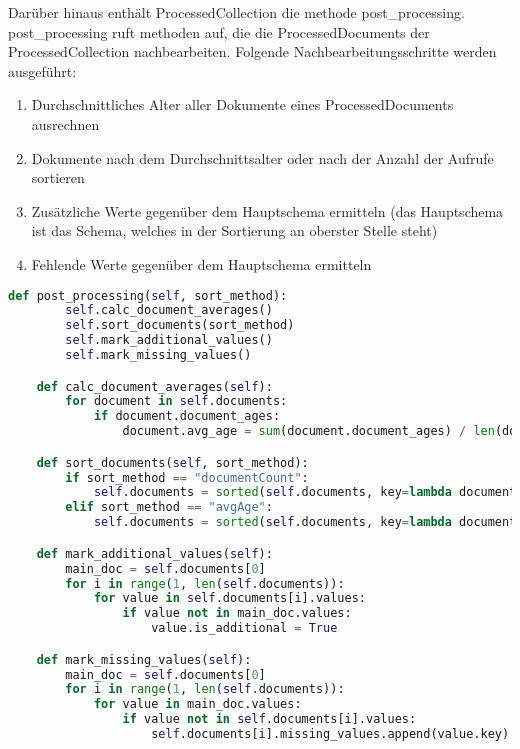 Darüber hinaus enthält ProcessedCollection die methode post\_processing.
post\_processing ruft methoden auf, die die ProcessedDocuments der ProcessedCollection nachbearbeiten.
Folgende Nachbearbeitungsschritte werden ausgeführt:
\begin{enumerate}
    \item Durchschnittliches Alter aller Dokumente eines ProcessedDocuments ausrechnen
    \item Dokumente nach dem Durchschnittsalter oder nach der Anzahl der Aufrufe sortieren
    \item Zusätzliche Werte gegenüber dem Hauptschema ermitteln (das Hauptschema ist das Schema, welches in der Sortierung an oberster Stelle steht)
    \item Fehlende Werte gegenüber dem Hauptschema ermitteln
\end{enumerate}

\begin{lstlisting}[language=python, caption={ProcessedCollection.post\_processing},label={lst:backend_post_processing}]
    def post_processing(self, sort_method):
        self.calc_document_averages()
        self.sort_documents(sort_method)
        self.mark_additional_values()
        self.mark_missing_values()

    def calc_document_averages(self):
        for document in self.documents:
            if document.document_ages:
                document.avg_age = sum(document.document_ages) / len(document.document_ages)

    def sort_documents(self, sort_method):
        if sort_method == "documentCount":
            self.documents = sorted(self.documents, key=lambda document: document.count, reverse=True)
        elif sort_method == "avgAge":
            self.documents = sorted(self.documents, key=lambda document: document.avg_age, reverse=True)

    def mark_additional_values(self):
        main_doc = self.documents[0]
        for i in range(1, len(self.documents)):
            for value in self.documents[i].values:
                if value not in main_doc.values:
                    value.is_additional = True

    def mark_missing_values(self):
        main_doc = self.documents[0]
        for i in range(1, len(self.documents)):
            for value in main_doc.values:
                if value not in self.documents[i].values:
                    self.documents[i].missing_values.append(value.key)
\end{lstlisting}

